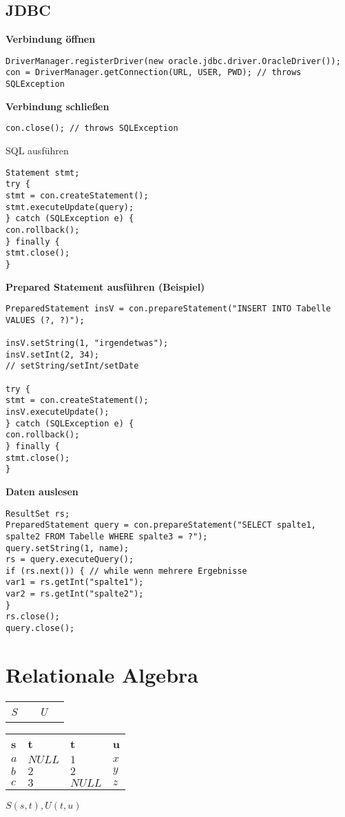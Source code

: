 \documentclass{article}
\begin{document}
		\subsection*{JDBC}
			\textbf{Verbindung \"offnen}
			\begin{lstlisting}[frame=L]
DriverManager.registerDriver(new oracle.jdbc.driver.OracleDriver());
con = DriverManager.getConnection(URL, USER, PWD); // throws SQLException
\end{lstlisting}
			\textbf{Verbindung schlie\ss en}
			\begin{lstlisting}[frame=L]
con.close(); // throws SQLException
\end{lstlisting}
			SQL ausf\"uhren
			\begin{lstlisting}[frame=L]
Statement stmt;
try {
stmt = con.createStatement();
stmt.executeUpdate(query);
} catch (SQLException e) {
con.rollback();
} finally {
stmt.close();
}
\end{lstlisting}
			\textbf{Prepared Statement ausf\"uhren (Beispiel)}
			\begin{lstlisting}[frame=L]
PreparedStatement insV = con.prepareStatement("INSERT INTO Tabelle VALUES (?, ?)");

insV.setString(1, "irgendetwas");
insV.setInt(2, 34);
// setString/setInt/setDate

try {
stmt = con.createStatement();
insV.executeUpdate();
} catch (SQLException e) {
con.rollback();
} finally {
stmt.close();
}
\end{lstlisting}
			\textbf{Daten auslesen}
			\begin{lstlisting}[frame=L]
ResultSet rs;
PreparedStatement query = con.prepareStatement("SELECT spalte1, spalte2 FROM Tabelle WHERE spalte3 = ?");
query.setString(1, name);
rs = query.executeQuery();
if (rs.next()) { // while wenn mehrere Ergebnisse
var1 = rs.getInt("spalte1");
var2 = rs.getInt("spalte2");
}
rs.close();
query.close();
\end{lstlisting}
	\section*{Relationale Algebra}
		\begin{tabular}{p{3cm}  p{3cm}  p{3cm}  p{3cm}}
			\textit{S} & & \textit{U} & \\
		\end{tabular}
		\begin{tabular}{p{3cm} | p{3cm}  p{3cm} | p{3cm}}
			\textbf{s} & \textbf{t} & \textbf{t} & \textbf{u}\\
			$a$ & $NULL$ & $1$ & $x$\\
			$b$ & $2$ & $2$ & $y$\\
			$c$ & $3$ & $NULL$ & $z$\\
		\end{tabular}
		$S(s, t), U(t, u)$\\
\end{document}
